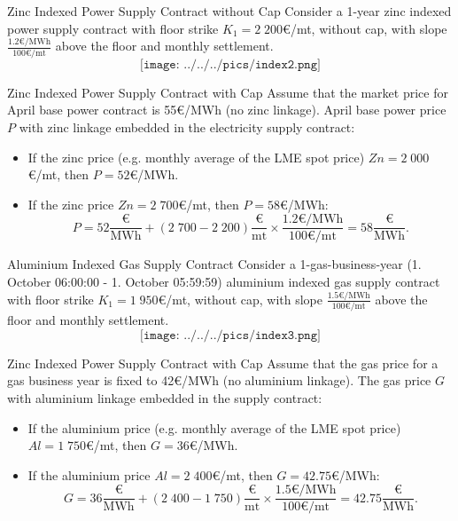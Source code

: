 {Zinc Indexed Power Supply Contract without Cap}
Consider a 1-year zinc indexed power supply contract with floor strike $K_1=2\;200$€/mt, without cap, with slope $\frac{1.2\text{€/MWh}}{100\text{€/mt}}$ above the floor and monthly settlement.
$$\texttt{[image: ../../../pics/index2.png]}$$



{Zinc Indexed Power Supply Contract with Cap}
Assume that the market price for April base power contract is \textcolor[rgb]{1.00,0.00,0.00}{55€/MWh} (no zinc linkage). April base power price $P$ with zinc linkage embedded in the electricity supply contract:
\vspace{0.4cm}
\begin{itemize}
  \item<2-> If the zinc price (e.g. monthly average of the LME spot price) $Zn=2\;000$€/mt, then \textcolor[rgb]{0.00,0.00,1.00}{$P=52$€/MWh}.
  \item<3-> If the zinc price $Zn=2\;700$€/mt, then \textcolor[rgb]{0.00,0.00,1.00}{$P=58$€/MWh}:
  $$P=52\frac{\text{€}}{\text{MWh}}+(2\;700-2\;200)\frac{\text{€}}{\text{mt}}\times\frac{1.2\text{€/MWh}}{100\text{€/mt}}=58\frac{\text{€}}{\text{MWh}}.$$
\end{itemize}



{Aluminium Indexed Gas Supply Contract}
Consider a 1-gas-business-year (1. October 06:00:00 - 1. October 05:59:59) aluminium indexed gas supply contract with floor strike $K_1=1\;950$€/mt, without cap, with slope $\frac{1.5\text{€/MWh}}{100\text{€/mt}}$ above the floor and monthly settlement.
$$\texttt{[image: ../../../pics/index3.png]}$$




{Zinc Indexed Power Supply Contract with Cap}
Assume that the gas price for a gas business year is fixed to \textcolor[rgb]{1.00,0.00,0.00}{42€/MWh} (no aluminium linkage). The gas price $G$ with aluminium linkage embedded in the supply contract:
\vspace{0.4cm}
\begin{itemize}
  \item<2-> If the aluminium price (e.g. monthly average of the LME spot price) $Al=1\;750$€/mt, then \textcolor[rgb]{0.00,0.00,1.00}{$G=36$€/MWh}.
  \item<3-> If the aluminium price $Al=2\;400$€/mt, then \textcolor[rgb]{0.00,0.00,1.00}{$G=42.75$€/MWh}:
  $$G=36\frac{\text{€}}{\text{MWh}}+(2\;400-1\;750)\frac{\text{€}}{\text{mt}}\times\frac{1.5\text{€/MWh}}{100\text{€/mt}}=42.75\frac{\text{€}}{\text{MWh}}.$$
\end{itemize}




